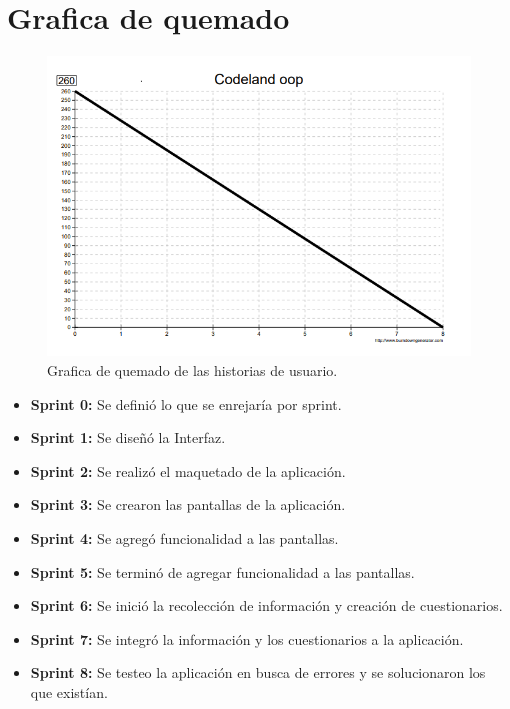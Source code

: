 \section{Grafica de quemado}
\begin{figure}[H]
	\begin{center}
		\includegraphics[scale=0.7]{img/quemado.png} 
		\caption{Grafica de quemado de las historias de usuario.}
		\label{quemado}
	\end{center}
\end{figure}

\begin{itemize}
\item\textbf{Sprint 0: }Se definió lo que se enrejaría por sprint.
\item\textbf{Sprint 1: }Se diseñó la Interfaz.
\item\textbf{Sprint 2: }Se realizó el maquetado de la aplicación.
\item\textbf{Sprint 3: }Se crearon las pantallas de la aplicación.
\item\textbf{Sprint 4: }Se agregó funcionalidad a las pantallas.
\item\textbf{Sprint 5: }Se terminó de agregar funcionalidad a las pantallas.
\item\textbf{Sprint 6: }Se inició la recolección de información y creación de cuestionarios.
\item\textbf{Sprint 7: }Se integró la información y los cuestionarios a la aplicación. 
\item\textbf{Sprint 8: }Se testeo la aplicación en busca de errores y se solucionaron los que existían.
\end{itemize}


